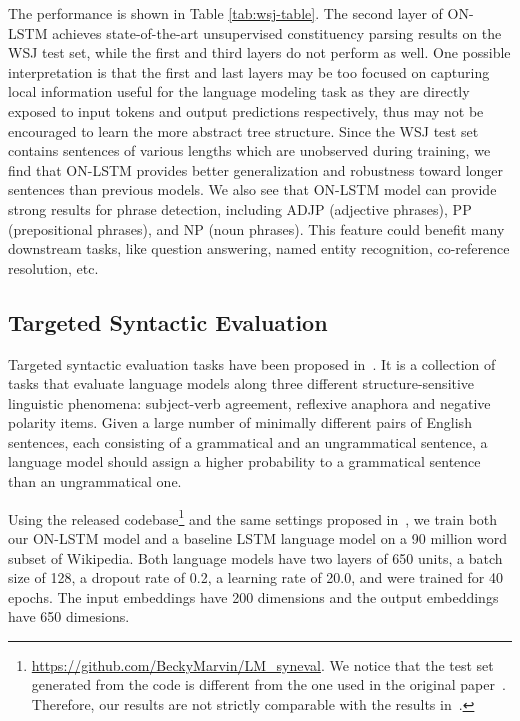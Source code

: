 \documentclass{article} \usepackage{iclr2019_conference,times}
\begin{document}
The performance is shown in Table \ref{tab:wsj-table}.
The second layer of ON-LSTM achieves state-of-the-art unsupervised constituency parsing results on the WSJ test set, while the first and third layers do not perform as well.
One possible interpretation is that the first and last layers may be too focused on capturing local information useful for the language modeling task as they are directly exposed to input tokens and output predictions respectively, thus may not be encouraged to learn the more abstract tree structure.
Since the WSJ test set contains sentences of various lengths which are unobserved during training, we find that ON-LSTM provides better generalization and robustness toward longer sentences than previous models.
We also see that ON-LSTM model can provide strong results for phrase detection, including ADJP (adjective phrases), PP (prepositional phrases), and NP (noun phrases).
This feature could benefit many downstream tasks, like question answering, named entity recognition, co-reference resolution, etc.

\subsection{Targeted Syntactic Evaluation}
Targeted syntactic evaluation tasks have been proposed in~\citet{marvin2018targeted}. It is a collection of tasks that evaluate language models along three different structure-sensitive linguistic phenomena: subject-verb agreement, reflexive anaphora and negative polarity items.
Given a large number of minimally different pairs of English sentences, each consisting of a grammatical and an ungrammatical sentence, a language model should assign a higher probability to a grammatical sentence than an ungrammatical one.

Using the released codebase\footnote{\url{https://github.com/BeckyMarvin/LM_syneval}. We notice that the test set generated from the code is different from the one used in the original paper~\citet{marvin2018targeted}. Therefore, our results are not strictly comparable with the results in~\citet{marvin2018targeted}.} and the same settings proposed in~\citet{marvin2018targeted}, we train both our ON-LSTM model and a baseline LSTM language model on a 90 million word subset of Wikipedia.
Both language models have two layers of 650 units, a batch size of 128, a dropout rate of 0.2, a learning rate of 20.0, and were trained for 40 epochs.
The input embeddings have 200 dimensions and the output embeddings have 650 dimesions.
\end{document}
